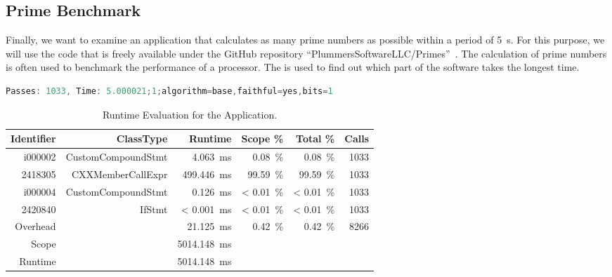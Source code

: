 \subsection{Prime Benchmark}
\label{sectionPrimeCode}
Finally, we want to examine an application that calculates as many prime numbers as possible within a period of \SI{5}{\second}. For this purpose, we will use the code that is freely available under the GitHub repository ``PlummersSoftwareLLC/Primes''~\cite{PrimeBenchmark}. The calculation of prime numbers is often used to benchmark the performance of a processor. The \TOOL is used to find out which part of the software takes the longest time. 

\begin{lstlisting}[float, language=C++, caption=Output of the \PRIME Application., label=lst:e:primeoutput_terminal]
Passes: 1033, Time: 5.000021;1;algorithm=base,faithful=yes,bits=1
\end{lstlisting}

\begin{table}
  \centering
  \caption{Runtime Evaluation for the \PRIME Application.}
  \begin{tabular}{rrrrrr}
    \toprule
    Identifier & ClassType          & Runtime                      &  Scope \%             &  Total \%             & Calls \\
    \midrule
    i000002    & CustomCompoundStmt & \SI{4.063}{\milli\second}    & \SI{0.08}{\percent}   & \SI{0.08}{\percent}   & 1033  \\
    2418305    & CXXMemberCallExpr  & \SI{499.446}{\milli\second}  & \SI{99.59}{\percent}  & \SI{99.59}{\percent}  & 1033  \\
    i000004    & CustomCompoundStmt & \SI{0.126}{\milli\second}    & < \SI{0.01}{\percent} & < \SI{0.01}{\percent} & 1033  \\
    2420840    & IfStmt             & < \SI{0.001}{\milli\second}  & < \SI{0.01}{\percent} & < \SI{0.01}{\percent} & 1033  \\
    Overhead   &                    & \SI{21.125}{\milli\second}   & \SI{0.42}{\percent}   & \SI{0.42}{\percent}   & 8266  \\
    \midrule
    Scope      &                    & \SI{5014.148}{\milli\second} &                       &                       &       \\
    Runtime    &                    & \SI{5014.148}{\milli\second} &                       &                       &       \\
    \bottomrule
  \end{tabular}
  \label{tab:e:primeoutput1}
\end{table}

